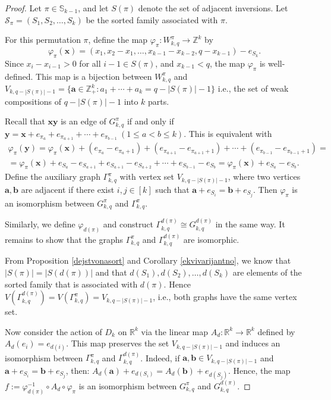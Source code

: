 \documentclass{birkjour}
\theoremstyle{definition}
\theoremstyle{remark}
\numberwithin{equation}{section}
\begin{document}
\begin{proof}

 Let $\pi\in\mathbb S_{k-1}$, and let $S(\pi)$ denote the
 set of adjacent inversions. Let $\mathcal{S}_\pi=(S_1,S_2,\ldots,S_k)$
 be the sorted family associated with $\pi$.

  For this permutation $\pi$, define the map
  $\varphi_\pi:W_{k,q}^\pi\to \mathbb Z^k$ by
\[\varphi_\pi(\mathbf{x})=(x_1,x_2-x_1,\ldots,x_{k-1}-x_{k-2},q-x_{k-1})-
e_{S_k}.\]Since
 $x_i-x_{i-1}>0$ for all $i-1\in S(\pi)$, and $x_{k-1}<q$, the map
 $\varphi_\pi$ is well-defined.
 This map is a bijection between $W_{k,q}^\pi$
  and $V_{k,q-|S(\pi)|-1}=
  \{\mathbf{a}\in\mathbb Z^k_+:a_1+\cdots+a_k=q-|S(\pi)|-1\}$
  i.e., the set of weak compositions of
  $q - |S(\pi)| - 1$ into $k$ parts.

Recall that $\mathbf{x}\mathbf{y}$ is an edge of $G_{k,q}^\pi$ if
and only if
 $\mathbf{y}=\mathbf{x}+e_{\pi_a}+e_{\pi_{a+1}}+\cdots+e_{\pi_{b-1}}
 \ (1\leq a<b\leq k)$. This is equivalent with
\begin{multline*}
\varphi_\pi(\mathbf{y})=\varphi_\pi(\mathbf{x})+(e_{\pi_a}-e_{\pi_a+1})+
(e_{\pi_{a+1}}-e_{\pi_{a+1}+1})+\cdots+(e_{\pi_{b-1}}-e_{\pi_{b-1}+1})=\\
=\varphi_\pi(\mathbf{x})+e_{S_a}-e_{S_{a+1}}+e_{S_{a+1}}-
e_{S_{a+2}}+\cdots+e_{S_{b-1}}-e_{S_b}=\varphi_\pi(\mathbf{x})+e_{S_a}-e_{S_b}.
\end{multline*}
Define the auxiliary graph $\Gamma_{k,q}^\pi$ with vertex set
$V_{k,q-|S(\pi)|-1}$, where two vertices $\mathbf{a}, \mathbf{b}$
are adjacent if there exist $i, j \in [k]$ such that $\mathbf{a} +
e_{S_i} = \mathbf{b} + e_{S_j}$. Then $\varphi_\pi$ is an
isomorphism between $G_{k,q}^\pi$ and $\Gamma_{k,q}^\pi$.

Similarly, we define $\varphi_{d(\pi)}$ and construct
$\Gamma_{k,q}^{d(\pi)}\cong G^{d(\pi)}_{k,q}$ in the same way.
  It remains to show that the graphs $\Gamma_{k,q}^\pi$ and
  $\Gamma_{k,q}^{d(\pi)}$ are isomorphic.

From Proposition \ref{dejstvonasort} and Corollary
\ref{ekvivarijantno}, we know that
 $|S(\pi)|=|S(d(\pi))|$ and that
$d(S_1),d(S_2),\ldots,d(S_k)$ are elements of the sorted family
that is associated with $d(\pi)$. Hence
$V(\Gamma_{k,q}^{d(\pi)})=V(\Gamma_{k,q}^\pi)=V_{k,q-|S(\pi)|-1}$,
i.e., both graphs have the same vertex set.

\noindent Now consider the action of $D_k$ on $\mathbb{R}^k$ via
the linear map $A_d: \mathbb{R}^k \to \mathbb{R}^k$ defined by
$A_d(e_i) = e_{d(i)}$. This map preserves the set $V_{k,q -
|S(\pi)| - 1}$ and induces an isomorphism between
$\Gamma_{k,q}^\pi$ and $\Gamma_{k,q}^{d(\pi)}$. Indeed, if
$\mathbf{a}, \mathbf{b} \in V_{k,q - |S(\pi)| - 1}$ and
$\mathbf{a} + e_{S_i} = \mathbf{b} + e_{S_j}$, then: $
A_d(\mathbf{a}) + e_{d(S_i)} = A_d(\mathbf{b}) + e_{d(S_j)}$.
Hence, the map $ f := \varphi_{d(\pi)}^{-1} \circ A_d \circ
\varphi_\pi $ is an isomorphism between $G_{k,q}^\pi$ and
$G_{k,q}^{d(\pi)}$.




\end{proof}
\end{document}
